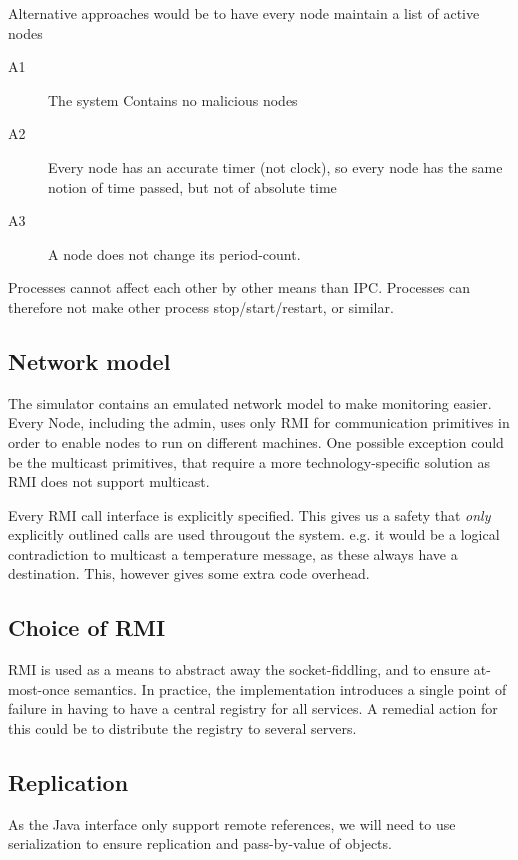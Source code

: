 \documentclass[10pt,a4paper]{article}
\begin{document}
Alternative approaches would be to have every node maintain a list of active nodes

\begin{description}
 \item[A1] The system Contains no malicious nodes
 \item[A2] Every node has an accurate timer (not clock), so every node has the same notion of time passed, but not of absolute time
 \item[A3] A node does not change its period-count.
\end{description} 



Processes cannot affect each other by other means than IPC. Processes can therefore not make other process stop/start/restart, or similar.

\subsection{Network model}
The simulator contains an emulated network model to make monitoring easier. Every Node, including the admin, uses only RMI for communication primitives in order to enable nodes to run on different machines.
One possible exception could be the multicast primitives, that require a more technology-specific solution as RMI does not support multicast.

Every RMI call interface is explicitly specified. This gives us a safety that \emph{only} explicitly outlined calls are used througout the system. e.g. it would be a logical contradiction to multicast a temperature message, as these always have a destination. This, however gives some extra code overhead.

\subsection{Choice of RMI}
RMI is used as a means to abstract away the socket-fiddling, and to ensure at-most-once semantics. In practice, the implementation introduces a single point of failure in having to have a central registry for all services. A remedial action for this could be to distribute the registry to several servers.

\subsection{Replication}
As the Java interface  only support remote references, we will need to use serialization to ensure replication and pass-by-value of objects.
\end{document}
